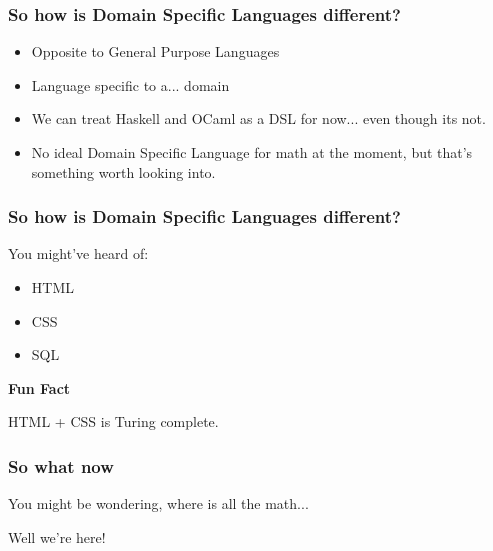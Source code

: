 \documentclass[handout]{beamer}
\begin{document}
    \begin{frame}
        \frametitle{So how is Domain Specific Languages different?}

        \begin{itemize}
            \item<1-> Opposite to General Purpose Languages
            \item<2-> Language specific to a... domain
            \item<3-> We can treat Haskell and OCaml as a DSL for now... even though its not.
            \item<4-> No ideal Domain Specific Language for math at the moment, but that's something worth looking into.
        \end{itemize}
    \end{frame}

    \begin{frame}
        \frametitle{So how is Domain Specific Languages different?}

        You might've heard of:
        \begin{itemize}
            \item<1-> HTML
            \item<2-> CSS
            \item<3-> SQL
        \end{itemize}

        \pause\pause\pause
        \begin{center}
            \textbf{Fun Fact}

            HTML + CSS is Turing complete.
        \end{center}
    \end{frame}



    \begin{frame}
        \frametitle{So what now}

        You might be wondering, where is all the math... \pause

        Well we're here!
    \end{frame}
\end{document}
